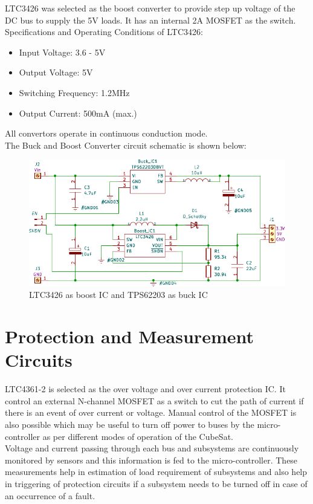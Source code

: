  LTC3426 was selected as the boost converter to provide step up voltage of the DC bus to supply the 5V loads. It has an internal 2A MOSFET as the switch.\\
 
  Specifications and Operating Conditions of LTC3426:
 \begin{itemize}
 	\item Input Voltage: 3.6 - 5V
 	\item Output Voltage: 5V
 	\item Switching Frequency: 1.2MHz
 	\item Output Current: 500mA (max.)
 \end{itemize}
All convertors operate in continuous conduction mode.\\

The Buck and Boost Converter circuit schematic is shown below:
\begin{figure}[ht]
	\centering
	\includegraphics[width=\columnwidth]{1.pdf}
	\caption{LTC3426 as boost IC and TPS62203 as buck IC}
	\label{fig:bubo}
\end{figure}



\section[Protection Circuits]{Protection and Measurement Circuits}


LTC4361-2 is selected as the over voltage and over current protection IC. It control an external N-channel MOSFET as a switch to cut the path of current if there is an event of over current or voltage. Manual control of the MOSFET is also possible which may be useful to turn off power to buses by the micro-controller as per different modes of operation of the CubeSat.
\\

 Voltage and current passing through each bus and subsystems are continuously monitored by sensors and this information is fed to the micro-controller. These measurements help in estimation of load requirement of subsystems and also help in triggering of protection circuits if a subsystem needs to be turned off in case of an occurrence of a fault. 
 \\
 
